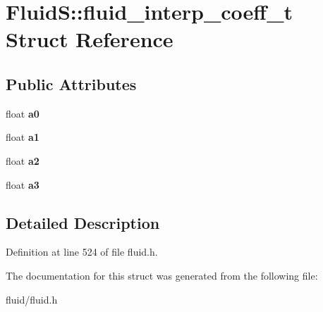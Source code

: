 \hypertarget{struct_fluid_s_1_1fluid__interp__coeff__t}{}\section{FluidS\+:\+:fluid\+\_\+interp\+\_\+coeff\+\_\+t Struct Reference}
\label{struct_fluid_s_1_1fluid__interp__coeff__t}
\subsection*{Public Attributes}
\begin{DoxyCompactItemize}
\item 
\mbox{\label{struct_fluid_s_1_1fluid__interp__coeff__t_a1d285a9bb111c846bd5283ca50d6d384}} 
float {\bfseries a0}
\item 
\mbox{\label{struct_fluid_s_1_1fluid__interp__coeff__t_a27f9f7da72cc7be477c952d62f6adf85}} 
float {\bfseries a1}
\item 
\mbox{\label{struct_fluid_s_1_1fluid__interp__coeff__t_aa51e0416e5905840ffc52c11e42052ec}} 
float {\bfseries a2}
\item 
\mbox{\label{struct_fluid_s_1_1fluid__interp__coeff__t_a993e31ccffb0876cc19071806290433c}} 
float {\bfseries a3}
\end{DoxyCompactItemize}


\subsection{Detailed Description}


Definition at line 524 of file fluid.\+h.



The documentation for this struct was generated from the following file\+:\begin{DoxyCompactItemize}
\item 
fluid/fluid.\+h\end{DoxyCompactItemize}

